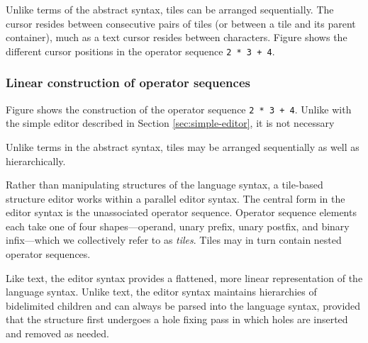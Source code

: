 Unlike terms of the abstract syntax, tiles can be arranged
sequentially.
The cursor resides between consecutive pairs of
tiles (or between a tile and its parent container),
much as a text cursor resides between characters.
Figure  shows the different cursor positions
in the operator sequence \texttt{2 * 3 + 4}.

\subsubsection{Linear construction of operator sequences}
Figure  shows the construction of the operator
sequence \texttt{2 * 3 + 4}. Unlike with the simple editor described
in Section \ref{sec:simple-editor}, it is not necessary

Unlike terms in the abstract syntax, tiles may be arranged
sequentially as well as hierarchically.

Rather than manipulating structures of the language syntax,
a tile-based structure editor works within a parallel editor syntax.
The central form in the editor syntax is the unassociated operator
sequence. Operator sequence elements each take one of four shapes---operand,
unary prefix, unary postfix, and
binary infix---which we collectively refer to as \emph{tiles}.
Tiles may in turn contain nested operator sequences.

Like text, the editor syntax provides a flattened, more linear representation
of the language syntax.
Unlike text, the editor syntax maintains hierarchies of
bidelimited children and can always be parsed into the
language syntax, provided that the structure first undergoes
a hole fixing pass in which holes are inserted and removed
as needed.


